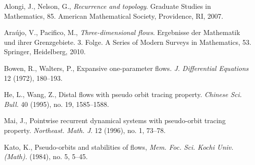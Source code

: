 \documentclass{amsart}
\theoremstyle{definition}
\begin{document}
\begin{thebibliography}{99}
 Alongi, J., Nelson, G., {\em Recurrence and topology}. Graduate Studies in Mathematics, 85. American Mathematical Society, Providence, RI, 2007. 


 Ara\'{u}jo, V., Pacifico, M., {\em Three-dimensional flows}. Ergebnisse der Mathematik und ihrer Grenzgebiete. 3. Folge. A Series of Modern Surveys in Mathematics, 53. Springer, Heidelberg, 2010. 



 	
 	
 Bowen, R., Walters, P., Expansive one-parameter flows. {\em J. Differential Equations} 12 (1972), 180--193.






 He, L., Wang, Z., Distal flows with pseudo orbit tracing property. {\em Chinese Sci. Bull.} 40 (1995), no. 19, 1585--1588.
 	
 Mai, J., Pointwise recurrent dynamical systems with pseudo-orbit tracing property. {\em Northeast. Math. J}. 12 (1996), no. 1, 73--78.  	
 	
  Kato, K., Pseudo-orbits and stabilities of flows, {\em Mem. Foc. Sci. Kochi Univ. (Math).} (1984), no. 5, 5--45.


\end{thebibliography}
\end{document}
